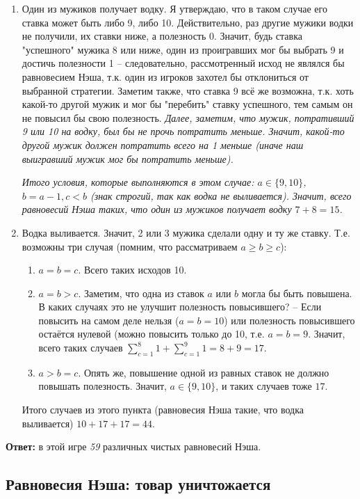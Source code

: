 \documentclass[a4paper,11pt,notitlepage]{article}
\newcommand{\ans}{\textbf{Ответ: }}
\begin{document}
\begin{enumerate}
\item  Один из мужиков получает водку. Я утверждаю, что в таком случае его ставка может быть либо 9, либо 10. Действительно, раз другие мужики водки не получили, их ставки ниже, а полезность 0. Значит, будь ставка "успешного" мужика 8 или ниже, один из проигравших мог бы выбрать 9 и достичь полезности 1 -- следовательно, рассмотренный исход не являлся бы равновесием Нэша, т.к. один из игроков захотел бы отклониться от выбранной стратегии. Заметим также, что ставка 9 всё же возможна, т.к. хоть какой-то другой мужик и мог бы "перебить" ставку успешного, тем самым он не повысил бы свою полезность. \textit{Далее, заметим, что мужик, потративший 9 или 10 на водку, был бы не прочь потратить меньше. Значит, какой-то другой мужик должен потратить всего на 1 меньше (иначе наш выигравший мужик мог бы потратить меньше).}

\textit{Итого условия, которые выполняются в этом случае: $ a \in \{9,  10\}$, $ b = a - 1, c < b$ (знак строгий, так как водка не выливается). Значит, всего равновесий Нэша таких, что один из мужиков получает водку $7 + 8 = 15$.}

\item Водка выливается. Значит, 2 или 3 мужика сделали одну и ту же ставку. Т.е. возможны три случая (помним, что рассматриваем $a \geq b \geq c$):
	\begin{enumerate}
		\item $a = b = c$. Всего таких исходов 10.
		\item $a = b > c$. Заметим, что одна из ставок $a$ или $b$ могла бы быть повышена. В каких случаях это не улучшит полезность повысившего? -- Если повысить на самом деле нельзя ($a = b = 10$) или полезность повысившего остаётся нулевой (можно повысить только до 10, т.е. $a = b = 9$. Значит, всего таких случаев $\sum_{c = 1}^8 1 + \sum_{c=1}^9 1 = 8 + 9 = 17$.
		\item $a > b = c$. Опять же, повышение одной из равных ставок не должно повышать полезность. Значит, $a \in \{9, 10 \}$, и таких случаев тоже $17$.
	\end{enumerate}
	
Итого случаев из этого пункта (равновесия Нэша такие, что водка выливается) $10 + 17 + 17 = 44$.
\end{enumerate}

\ans в этой игре \textit{59} различных чистых равновесий Нэша.

\subsection{Равновесия Нэша: товар уничтожается}
\end{document}
